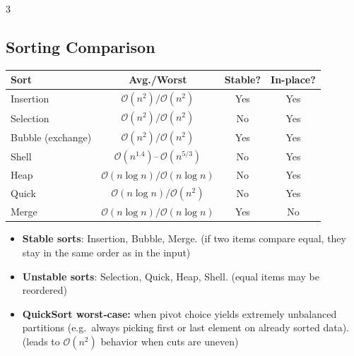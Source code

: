 \documentclass[6pt,landscape]{article}
\newcommand{\bigO}[1]{\ensuremath{\mathcal{O}(#1)}}
\newcommand{\keyword}[1]{\textbf{\textcolor{keywordcolor}{#1}}}
\begin{document}
\begin{multicols}{3}
\subsection{Sorting Comparison}\label{sec:sorting}
\begin{tabular}{|l|c|c|c|}
\hline
\textbf{Sort} & \textbf{Avg./Worst} & \textbf{Stable?} & \textbf{In-place?}\\\hline
Insertion & $\bigO{n^{2}}/\bigO{n^{2}}$ & Yes & Yes\\
Selection & $\bigO{n^{2}}/\bigO{n^{2}}$ & No & Yes\\
Bubble (exchange) & $\bigO{n^{2}}/\bigO{n^{2}}$ & Yes & Yes\\\hline
Shell  & $\bigO{n^{1.4}}\!$–$\,\bigO{n^{5/3}}$ & No & Yes\\
Heap & $\bigO{n\log n}/\bigO{n\log n}$ & No\footnotemark[1] & Yes\\
Quick & $\bigO{n\log n}/\bigO{n^{2}}$ & No\footnotemark[2] & Yes\\
Merge & $\bigO{n\log n}/\bigO{n\log n}$ & Yes & No\\\hline
\end{tabular}


\begin{itemize}
  \item \textbf{Stable sorts}: Insertion, Bubble, Merge.  (if two items compare equal, they stay in the same order as in the input)
  \item \textbf{Unstable sorts}: Selection, Quick, Heap, Shell.  (equal items may be reordered)
  \item \keyword{QuickSort worst‐case:} when pivot choice yields extremely unbalanced partitions (e.g.\ always picking first or last element on already sorted data).  (leads to \bigO{n^2} behavior when cuts are uneven)
\end{itemize}

\end{multicols}
\end{document}
